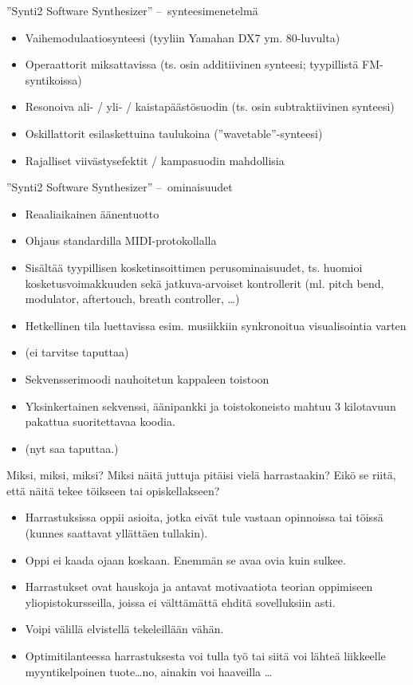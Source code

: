 \documentclass[pdf,handout,10pt]{beamer}
\begin{document}
\begin{frame}{''Synti2 Software Synthesizer'' --~synteesimenetelmä}

  \begin{itemize}
  \item Vaihemodulaatiosynteesi (tyyliin Yamahan DX7 ym. 80-luvulta)
  \item Operaattorit miksattavissa (ts. osin additiivinen synteesi;
    tyypillistä FM-syntikoissa)
  \item Resonoiva ali- / yli- / kaistapäästösuodin (ts. osin
    subtraktiivinen synteesi)
  \item Oskillattorit esilaskettuina taulukoina
    (''wavetable''-synteesi)
  \item Rajalliset viivästysefektit / kampasuodin mahdollisia
  \end{itemize}
\end{frame}

\begin{frame}{''Synti2 Software Synthesizer'' --~ominaisuudet}
  \begin{itemize}
  \item Reaaliaikainen äänentuotto 
  \item Ohjaus standardilla MIDI-protokollalla
  \item Sisältää tyypillisen kosketinsoittimen perusominaisuudet,
    ts. huomioi kosketusvoimakkuuden sekä jatkuva-arvoiset
    kontrollerit (ml. pitch bend, modulator, aftertouch, breath
    controller, \ldots)
  \item Hetkellinen tila luettavissa esim. musiikkiin synkronoitua
    visualisointia varten
  \item[] (ei tarvitse taputtaa)
  \item Sekvensserimoodi nauhoitetun kappaleen toistoon
  \item Yksinkertainen sekvenssi, äänipankki ja toistokoneisto mahtuu
    3 kilotavuun pakattua suoritettavaa koodia.
  \item[] (nyt saa taputtaa.)
  \end{itemize}
\end{frame}

\begin{frame}{Miksi, miksi, miksi?}
  Miksi näitä juttuja pitäisi vielä harrastaakin? Eikö se riitä, että
  näitä tekee töikseen tai opiskellakseen?
  \begin{itemize}
    \item Harrastuksissa oppii asioita, jotka eivät tule vastaan
      opinnoissa tai töissä (kunnes saattavat yllättäen tullakin).
    \item Oppi ei kaada ojaan koskaan. Enemmän se avaa ovia kuin
      sulkee.
    \item Harrastukset ovat hauskoja ja antavat motivaatiota teorian
      oppimiseen yliopistokursseilla, joissa ei välttämättä ehditä
      sovelluksiin asti.
    \item Voipi välillä elvistellä tekeleillään vähän.
    \item Optimitilanteessa harrastuksesta voi tulla työ tai siitä voi
      lähteä liikkeelle myyntikelpoinen tuote\ldots no, ainakin voi
      haaveilla \ldots
  \end{itemize}
\end{frame}
\end{document}
